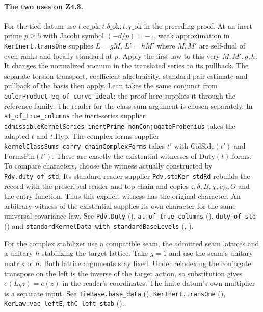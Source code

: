 \paragraph{The two uses on Z4.3.}\label{r14:eq-z43}
For the tied datum use $t.\mathrm{cc\_ok},t.\delta\mathrm{\_ok},
t.\chi\mathrm{\_ok}$ in the preceding proof. At an inert prime
$p\ge5$ with Jacobi symbol $(-d/p)=-1$, weak approximation in
\nolinkurl{KerInert.transOne} supplies $L=gM$, $L'=hM'$ where $M,M'$ are self-dual
of even ranks and locally standard at $p$.
Apply the first law to this very $M,M',g,h$. It changes the normalized
vacuum in the translated series to its pullback. The separate torsion
transport, coefficient algebraicity, standard-pair estimate and pullback
of the basis then apply. Lean takes the same conjunct from
\nolinkurl{eulerProduct_eq_of_curve_ideal}; the proof here supplies it
through the reference family. The reader for the class-sum argument is chosen separately. In
\nolinkurl{at_of_true_columns} the inert-series supplier
\nolinkurl{admissibleKernelSeries_inertPrime_nonConjugateFrobenius} takes
the adapted $t$ and $t.\mathrm{Hyp}$. The complex forms supplier
\nolinkurl{kernelClassSums_carry_chainComplexForms} takes
$t'$ with $\mathrm{ColSide}(t')$ and $\mathrm{FormsPin}(t')$.
These are exactly the existential witnesses of $\mathrm{Duty}(t).\mathrm{forms}$.
To compare characters, choose the witness actually constructed by
\nolinkurl{Pdv.duty_of_std}. Its standard-reader supplier
\nolinkurl{Pdv.stdKer_stdRd} rebuilds the record with the prescribed
reader and top chain and copies $\mathfrak c,\delta,B,\chi,c_D,O$ and
the entry function. Thus this explicit witness has the original
character. An arbitrary witness of the existential supplies its own
character for the same universal covariance law. See
\nolinkurl{Pdv.Duty} (),
\nolinkurl{at_of_true_columns} (),
\nolinkurl{duty_of_std} ()
and \nolinkurl{standardKernelData_with_standardBaseLevels}
(,
).

For the complex stabilizer use a compatible
seam, the admitted seam lattices and a unitary $h$ stabilizing the target
lattice. Take $g=1$ and use the seam's unitary matrix of $h$. Both lattice
arguments stay fixed. Under reindexing the conjugate transpose on the
left is the inverse of the target action, so substitution gives
$e(L_hz)=e(z)$ in the reader's coordinates. The finite datum's own
multiplier is a separate input. See \nolinkurl{TieBase.base_data}
(),
\nolinkurl{KerInert.transOne} (),
\nolinkurl{KerLaw.vac_leftE}, \nolinkurl{thC_left_stab}
().

